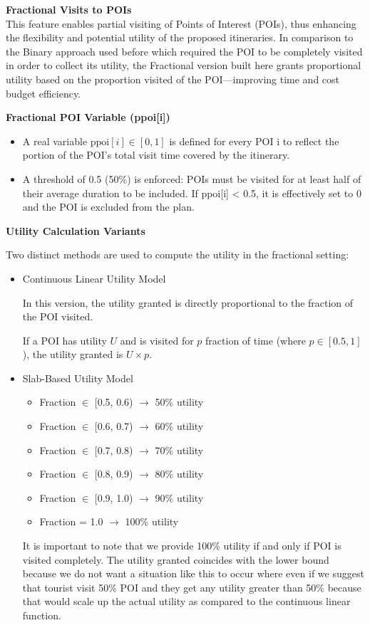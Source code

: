 \noindent \textbf{Fractional Visits to POIs}\\
This feature enables partial visiting of Points of Interest (POIs), thus enhancing the flexibility and potential utility of the proposed itineraries. In comparison to the Binary approach used before which required the POI to be completely visited in order to collect its utility, the Fractional version built here grants proportional utility based on the proportion visited of the POI—improving time and cost budget efficiency.

\textbf{Fractional POI Variable (ppoi[i])}
\begin{itemize}
    \item A real variable $\text{ppoi}[i] \in [0, 1]$ is defined for every POI i to reflect the portion of the POI's total visit time covered by the itinerary.

    \item A threshold of 0.5 (50\%) is enforced: POIs must be visited for at least half of their average duration to be included. If ppoi[i] < 0.5, it is effectively set to 0 and the POI is excluded from the plan.
\end{itemize}

\textbf{Utility Calculation Variants}
\label{Utility_Calculation}

Two distinct methods are used to compute the utility in the fractional setting:

\begin{itemize}
\item {Continuous Linear Utility Model}

In this version, the utility granted is directly proportional to the fraction of the POI visited.

If a POI has utility $U$ and is visited for $p$ fraction of time (where $p \in [0.5, 1]$), the utility granted is $U \times p$.

\item{Slab-Based Utility Model}
\begin{itemize}[noitemsep, topsep=0pt]
    \item Fraction $\in$ [0.5, 0.6) $\rightarrow$ 50\% utility
    \item Fraction $\in$ [0.6, 0.7) $\rightarrow$ 60\% utility
    \item Fraction $\in$ [0.7, 0.8) $\rightarrow$ 70\% utility
    \item Fraction $\in$ [0.8, 0.9) $\rightarrow$ 80\% utility
    \item Fraction $\in$ [0.9, 1.0) $\rightarrow$ 90\% utility
    \item Fraction = 1.0 $\rightarrow$ 100\% utility
\end{itemize}

It is important to note that we provide 100\% utility if and only if POI is visited completely. The utility granted coincides with the lower bound because we do not want a situation like this to occur where even if we suggest that tourist visit 50\% POI and they get any utility greater than 50\% because that would scale up the actual utility as compared to the continuous linear function.
\end{itemize}

